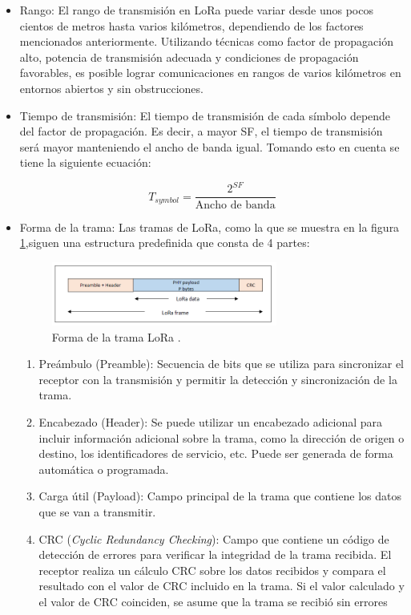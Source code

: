 \begin{itemize}
    \item Rango: El rango de transmisión en LoRa puede variar desde unos pocos cientos de metros hasta varios kilómetros, dependiendo de los factores mencionados anteriormente. Utilizando técnicas como factor de propagación alto, potencia de transmisión adecuada y condiciones de propagación favorables, es posible lograr comunicaciones en rangos de varios kilómetros en entornos abiertos y sin obstrucciones.
    
    \item Tiempo de transmisión: El tiempo de transmisión de cada símbolo depende del factor de propagación. Es decir, a mayor SF, el tiempo de transmisión será mayor manteniendo el ancho de banda igual. Tomando esto en cuenta se tiene la siguiente ecuación:
    
    \begin{equation}
        T_{symbol} = \frac{2^{SF}}{\text{Ancho de banda}}
    \end{equation}

    \item Forma de la trama: Las tramas de LoRa, como la que se muestra en la figura \ref{fig:trama},siguen una estructura predefinida que consta de 4 partes:
    
    \begin{figure}[H]
        \centering
        \includegraphics[width = 0.7\textwidth]{imagenes/cap1_marcoteo/FormatramaLora.png}
        \caption{Forma de la trama LoRa \citep{aloufi2020hybrid}.}
        \label{fig:trama}
    \end{figure}

    \begin{enumerate}
        \item Preámbulo (Preamble): Secuencia de bits que se utiliza para sincronizar el receptor con la transmisión y permitir la detección y sincronización de la trama.
        \item Encabezado (Header): Se puede utilizar un encabezado adicional para incluir información adicional sobre la trama, como la dirección de origen o destino, los identificadores de servicio, etc. Puede ser generada de forma automática o programada.
        \item Carga útil (Payload): Campo principal de la trama que contiene los datos que se van a transmitir. 
        \item CRC (\textit{Cyclic Redundancy Checking}): Campo que contiene un código de detección de errores para verificar la integridad de la trama recibida. El receptor realiza un cálculo CRC sobre los datos recibidos y compara el resultado con el valor de CRC incluido en la trama. Si el valor calculado y el valor de CRC coinciden, se asume que la trama se recibió sin errores
    \end{enumerate}




\end{itemize}
